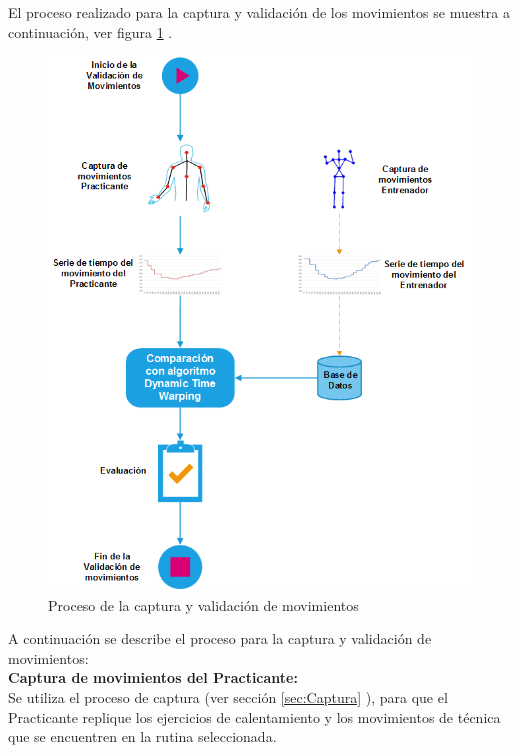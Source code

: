 El proceso realizado para la captura y validación de los movimientos se muestra a continuación, ver figura \ref{fig:ValidacionMovimiento} .
\begin{figure}[H]%
	\begin{center}
		\includegraphics[scale=0.75]{./Figuras/Implementacion/ValidacionMovimiento}
	\end{center}
	\caption{Proceso de la captura y validación de movimientos}
	\label{fig:ValidacionMovimiento}
\end{figure}
\clearpage

A continuación se describe el proceso para la captura y validación de movimientos:\\

\textbf{Captura de movimientos del Practicante:}\\
Se utiliza el proceso de captura (ver sección \ref{sec:Captura} ), para que el Practicante replique los ejercicios de calentamiento y los movimientos de técnica que se encuentren en la rutina seleccionada.\\

